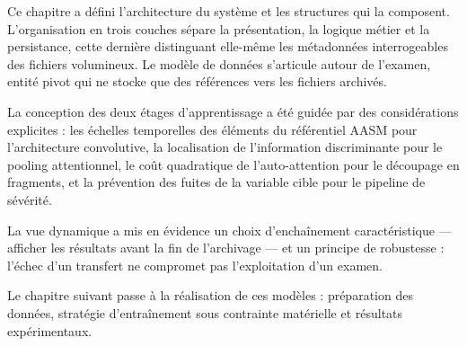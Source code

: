 Ce chapitre a défini l'architecture du système et les structures qui la composent.
L'organisation en trois couches sépare la présentation, la logique métier et la
persistance, cette dernière distinguant elle-même les métadonnées interrogeables des
fichiers volumineux. Le modèle de données s'articule autour de l'examen, entité pivot
qui ne stocke que des références vers les fichiers archivés.

La conception des deux étages d'apprentissage a été guidée par des considérations
explicites : les échelles temporelles des éléments du référentiel AASM pour
l'architecture convolutive, la localisation de l'information discriminante pour le
pooling attentionnel, le coût quadratique de l'auto-attention pour le découpage en
fragments, et la prévention des fuites de la variable cible pour le pipeline de
sévérité.

La vue dynamique a mis en évidence un choix d'enchaînement caractéristique — afficher
les résultats avant la fin de l'archivage — et un principe de robustesse : l'échec
d'un transfert ne compromet pas l'exploitation d'un examen.

Le chapitre suivant passe à la réalisation de ces modèles : préparation des données,
stratégie d'entraînement sous contrainte matérielle et résultats expérimentaux.
